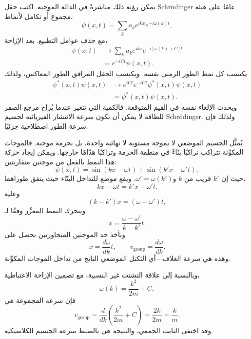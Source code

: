 يمكن رؤية ذلك مباشرةً في الدالة الموجية. اكتب حقل Schr\"odinger عامًا على هيئة مجموع أو تكامل لأنماط،
\begin{equation}
\psi(x,t)=\sum_k a_k e^{ikx}e^{-i\omega(k)t},
\end{equation}
مع حذف عوامل التطبيع. بعد الإزاحة،
\begin{align}
\psi(x,t)
&\longrightarrow
\sum_k a_k e^{ikx}e^{-i[\omega(k)+C]t}
\\
&=e^{-iCt}\psi(x,t).
\end{align}
يكتسب كل نمط الطور الزمني نفسه. ويكتسب الحقل المرافق الطور المعاكس، ولذلك
\begin{equation}
\begin{aligned}
\psi^*(x,t)\psi(x,t)
&\longrightarrow
e^{iCt}e^{-iCt}\psi^*(x,t)\psi(x,t)
\\
&=\psi^*(x,t)\psi(x,t).
\end{aligned}
\end{equation}
ويحدث الإلغاء نفسه في القيم المتوقعة. فالكمية التي تتغير عندما يُزاح مرجع الصفر للطاقة لا يمكن أن تكون سرعة الانتشار الفيزيائية لجسيم Schr\"odinger. ولذلك فإن سرعة الطور اصطلاحية جزئيًا.

يُمثَّل الجسيم الموضعي لا بموجة مستوية لا نهائية واحدة، بل بحزمة موجية. فالموجات المكوِّنة تتراكب تراكبًا بنّاءً في منطقة الحزمة وتراكبًا هدّامًا خارجها. ويمكن إيجاد حركة هذا النمط بالفعل من موجتين متقاربتين:
\begin{equation}
\psi(x,t)=
\sin(kx-\omega t)+
\sin(k'x-\omega't),
\end{equation}
حيث إن \(k'\) قريب من \(k\) و\(\omega'=\omega(k')\). ويقع موضع للتداخل البنّاء حيث يتفق طوراهما،
\begin{equation}
kx-\omega t=k'x-\omega't.
\end{equation}
وعليه
\begin{equation}
(k-k')x=(\omega-\omega')t,
\end{equation}
ويتحرك النمط المعزِّز وفقًا لـ
\begin{equation}
x=\frac{\omega-\omega'}{k-k'}t.
\end{equation}
وبأخذ حد الموجتين المتجاورتين نحصل على
\begin{equation}
x=\frac{d\omega}{dk}t,
\qquad
v_{\mathrm{group}}=\frac{d\omega}{dk}.
\end{equation}
وهذه هي سرعة الغلاف---أي التكتل الموضعي الناتج من تداخل الموجات المكوِّنة.

وبالنسبة إلى علاقة التشتت غير النسبية، مع تضمين الإزاحة الاعتباطية،
\begin{equation}
\omega(k)=\frac{k^2}{2m}+C,
\end{equation}
فإن سرعة المجموعة هي
\begin{equation}
v_{\mathrm{group}}
=\frac{d}{dk}\left(\frac{k^2}{2m}+C\right)
=\frac{2k}{2m}
=\frac{k}{m}.
\end{equation}
وقد اختفى الثابت الجمعي، والنتيجة هي بالضبط سرعة الجسيم الكلاسيكية.

